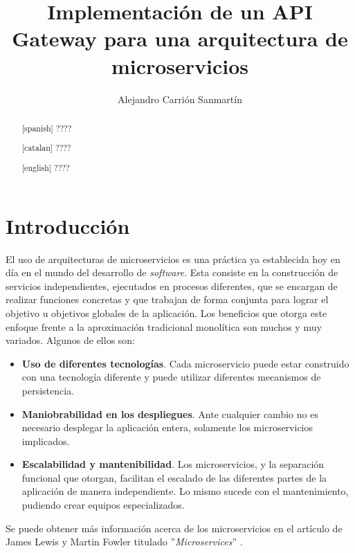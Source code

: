 \documentclass[11pt,spanish,listoffigures]{tfgetsinf}
\title{Implementación de un API Gateway para una arquitectura de microservicios}
\author{Alejandro Carrión Sanmartín}
\begin{document}

\begin{abstract}[spanish]
????
\end{abstract}
\begin{abstract}[catalan]
????
\end{abstract}
\begin{abstract}[english]
????
\end{abstract}

\mainmatter


\chapter{Introducción}

El uso de arquitecturas de microservicios es una práctica ya establecida hoy en día en el mundo del desarrollo de \emph{software}. Esta consiste en la construcción de servicios independientes, ejecutados en procesos diferentes, que se encargan de realizar funciones concretas y que trabajan de forma conjunta para lograr el objetivo u objetivos globales de la aplicación. Los beneficios que otorga este enfoque frente a la aproximación tradicional monolítica son muchos y muy variados. Algunos de ellos son:

\begin{itemize}

	\item \textbf{Uso de diferentes tecnologías}.
Cada microservicio puede estar construido con una tecnología diferente y puede utilizar diferentes mecanismos de persistencia.

	\item \textbf{Maniobrabilidad en los despliegues}.
Ante cualquier cambio no es necesario desplegar la aplicación entera, solamente los microservicios implicados.

	\item \textbf{Escalabilidad y mantenibilidad}.
Los microservicios, y la separación funcional que otorgan, facilitan el escalado de las diferentes partes de la aplicación de manera independiente. Lo mismo sucede con el mantenimiento, pudiendo crear equipos especializados.

\end{itemize}

Se puede obtener más información acerca de los microservicios en el artículo de James Lewis y Martin Fowler titulado ''\emph{Microservices}'' \cite{LewisAndFowler}.
\end{document}
